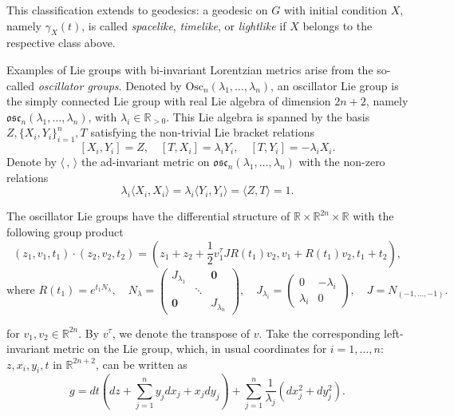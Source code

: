 \documentclass[12pt]{amsart}
\theoremstyle{plain}
\theoremstyle{definition}
\theoremstyle{remark}
\begin{document}
This classification extends to geodesics: a geodesic on \( G \) with initial condition \( X \), namely \( \gamma_X(t) \), is called \textit{spacelike}, \textit{timelike}, or \textit{lightlike} if \( X \) belongs to the respective class above.

Examples of Lie groups with bi-invariant Lorentzian metrics arise from the so-called \textit{oscillator groups}. Denoted by \( \text{Osc}_n(\lambda_1, \ldots, \lambda_n) \), an oscillator Lie group is the simply connected Lie group with real Lie algebra of dimension \( 2n + 2 \), namely \( \mathfrak{osc}_n(\lambda_1, \ldots, \lambda_n) \), with \( \lambda_i \in \mathbb{R}_{>0} \). This Lie algebra is spanned by the basis \( Z, \{X_i, Y_i\}_{i=1}^n, T \) satisfying the non-trivial Lie bracket relations
\[
[X_i, Y_i] = Z, \quad [T, X_i] = \lambda_i Y_i, \quad [T, Y_i] = -\lambda_i X_i.
\]
Denote by \( \langle\,,\, \rangle \) the ad-invariant metric on \( \mathfrak{osc}_n(\lambda_1, \ldots, \lambda_n) \) with the non-zero relations
\[
\lambda_i \langle X_i, X_i \rangle = \lambda_i \langle Y_i, Y_i \rangle = \langle Z, T \rangle = 1.
\]

The oscillator Lie groups have the differential structure of \( \mathbb{R} \times \mathbb{R}^{2n} \times \mathbb{R} \) with the following group product
\begin{equation*}
(z_1, v_1, t_1) \cdot (z_2, v_2, t_2) = \left(z_1 + z_2 + \frac{1}{2} v_1^{\tau} J R(t_1) v_2, v_1 + R(t_1) v_2, t_1 + t_2\right),
\end{equation*}
\[
\text{where } R(t_1) = e^{t_1 N_{\lambda}}, \quad N_\lambda = \left(\begin{matrix}
    J_{\lambda_1} &  & \mathbf{0} \\
    & \ddots & \\
    \mathbf{0} & & J_{\lambda_n}
\end{matrix}\right), \quad
J_{\lambda_i} = \left(\begin{matrix}
    0 & -\lambda_i \\
    \lambda_i & 0
\end{matrix}\right), \quad J = N_{(-1, \ldots, -1)}.
\]

for \( v_1, v_2 \in \mathbb{R}^{2n} \). By \( v^{\tau} \), we denote the transpose of \( v \). Take the corresponding left-invariant metric on the Lie group, which, in usual coordinates for \( i = 1, \ldots, n \): \( z, x_i, y_i, t \) in \( \mathbb{R}^{2n+2} \), can be written as
\begin{equation}\label{metricosc}
    g = dt \left(dz + \sum_{j=1}^{n} y_j dx_j + x_j dy_j\right) + \sum_{j=1}^{n} \frac{1}{\lambda_j} \left(dx_j^2 + dy_j^2\right).
\end{equation}
\end{document}
